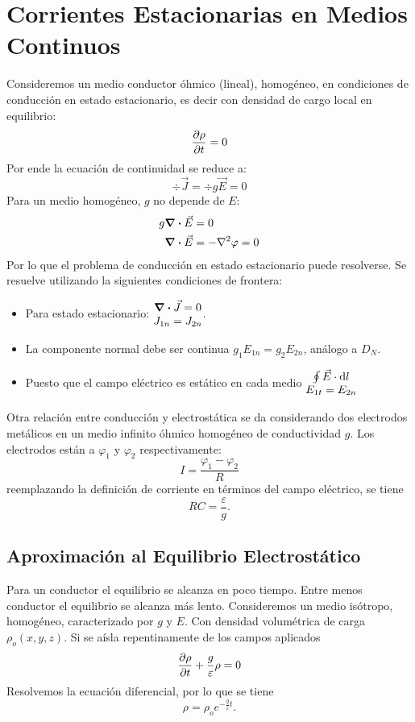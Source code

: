 \section{Corrientes Estacionarias en Medios Continuos}
Consideremos un medio conductor óhmico (lineal), homogéneo, en condiciones de conducción en estado estacionario, es decir con densidad de cargo local en equilibrio:
\begin{equation}
    \pdv{\rho}{t} (x,y,z) = 0
\end{equation}
Por ende la ecuación de continuidad se reduce a:
\begin{equation}
    \div{\vec{J}} = \div{g\vec{E}} = 0
\end{equation}
Para un medio homogéneo, $g$ no depende de $E$:
\begin{align*}
    g\div{\vec{E}} &= 0 \\
    \div{\vec{E}} &= -\laplacian{\varphi} = 0
\end{align*}
Por lo que el problema de conducción en estado estacionario puede resolverse. Se resuelve utilizando la siguientes condiciones de frontera:
\begin{itemize}
    \item Para estado estacionario: $\mqty{\div{\vec{J}} = 0 \\ J_{1n} = J_{2n}}$.
    \item La componente normal debe ser continua $g_1 E_{1n} = g_2 E_{2n}$, análogo a $D_N$.
    \item Puesto que el campo eléctrico es estático en cada medio $\mqty{\oint \vec{E} \cdot \dd{l} \\ E_{1t} = E_{2n}}$
\end{itemize}
Otra relación entre conducción y electrostática se da considerando dos electrodos metálicos en un medio infinito óhmico homogéneo de conductividad $g$. Los electrodos están a $\varphi _1$ y $\varphi _2$ respectivamente:
\begin{equation}
    I = \frac{\varphi _1 - \varphi_2}{R}
\end{equation}
reemplazando la definición de corriente en términos del campo eléctrico, se tiene
\begin{equation}
    RC = \frac{\varepsilon}{g}.
\end{equation}

\subsection{Aproximación al Equilibrio Electrostático}
Para un conductor el equilibrio se alcanza en poco tiempo. Entre menos conductor el equilibrio se alcanza más lento. Consideremos un medio isótropo, homogéneo, caracterizado por $g$ y $E$. Con densidad volumétrica de carga $\rho _o (x,y,z)$. Si se aísla repentinamente de los campos aplicados
\begin{equation}
    \pdv{\rho}{t} + \frac{g}{\varepsilon} \rho = 0
\end{equation}
Resolvemos la ecuación diferencial, por lo que se tiene
\begin{equation}
    \rho = \rho _o e^{-\frac{g}{\varepsilon} t}.
\end{equation}


